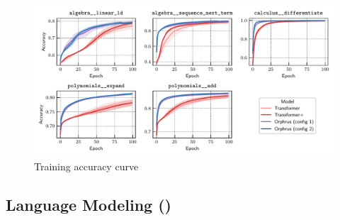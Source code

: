 \begin{figure}
    \centering
    \includegraphics[width=\textwidth]{figs/experiments/math/math_training_curves_trainacc.pdf}
    \caption{Training accuracy curve}
\end{figure}


\subsection{Language Modeling ()}\label{ssec:appendix_lm}

